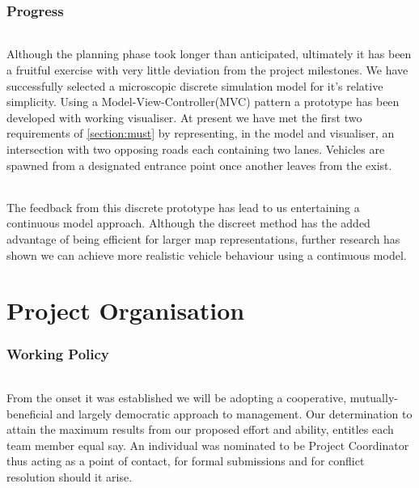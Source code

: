 \documentclass[11pt,a4paper]{article}
\begin{document}
\section{Progress}
\paragraph{}
Although the planning phase took longer than anticipated, ultimately it has been a fruitful exercise with very little deviation from the project milestones.  We have successfully selected a microscopic discrete simulation model for it's relative simplicity.  Using a Model-View-Controller(MVC) pattern a prototype has been developed with working visualiser.  At present we have met the first two requirements of \ref{section:must} by representing, in the model and visualiser, an intersection with two opposing roads each containing two lanes.  Vehicles are spawned from a designated entrance point once another leaves from the exist.    
\paragraph{}
The feedback from this discrete prototype has lead to us entertaining a continuous model approach.  Although the discreet method has the added advantage of being efficient for larger map representations, further research has shown we can achieve more realistic vehicle behaviour using a continuous model.

\pagebreak

\part{Project Organisation}

\section{Working Policy}
\paragraph{}
From the onset it was established we will be adopting a cooperative, mutually-beneficial and largely democratic approach to management.  Our determination to attain the maximum results from our proposed effort and ability, entitles each team member equal say.  An individual was nominated to be Project Coordinator thus acting as a point of contact, for formal submissions and for conflict resolution should it arise.
\end{document}
